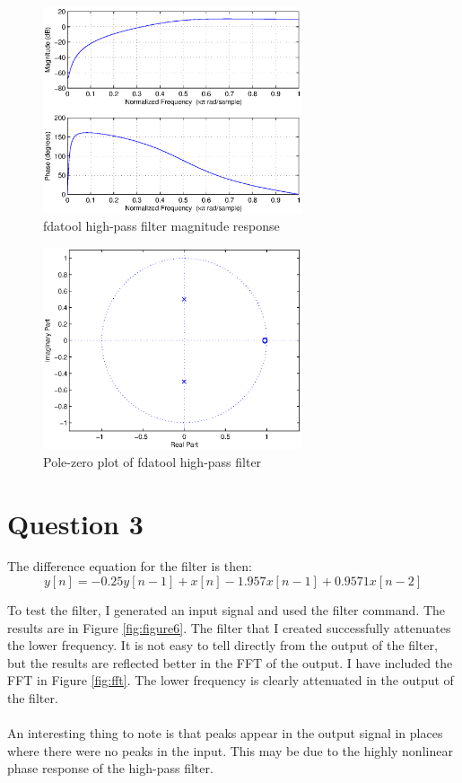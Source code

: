 \documentclass{article}
\begin{document}
\begin{figure}[htp]
	\begin{center}
		\includegraphics [width=3.0in]{hpmagresp.eps}
		\caption{fdatool high-pass filter magnitude response}
		\label{fig:figure4}
	\end{center}
\end{figure}

\begin{figure}[htp]
	\begin{center}
		\includegraphics [width=3.0in]{hpzplane.eps}
		\caption{Pole-zero plot of fdatool high-pass filter}
		\label{fig:figure5}
	\end{center}
\end{figure}

\section*{Question 3}
\begin{par}
The difference equation for the filter is then:
$$y[n] = -0.25y[n-1] + x[n] - 1.957x[n-1] + 0.9571x[n-2]$$

To test the filter, I generated an input signal and used the filter command.  The results are in Figure \ref{fig:figure6}.  The filter that I created successfully attenuates the lower frequency.  It is not easy to tell directly from the output of the filter, but the results are reflected better in the FFT of the output.  I have included the FFT in Figure \ref{fig:fft}.  The lower frequency is clearly attenuated in the output of the filter.\\
\\
An interesting thing to note is that peaks appear in the output signal in places where there were no peaks in the input.  This may be due to the highly nonlinear phase response of the high-pass filter.
\end{par}
\end{document}
